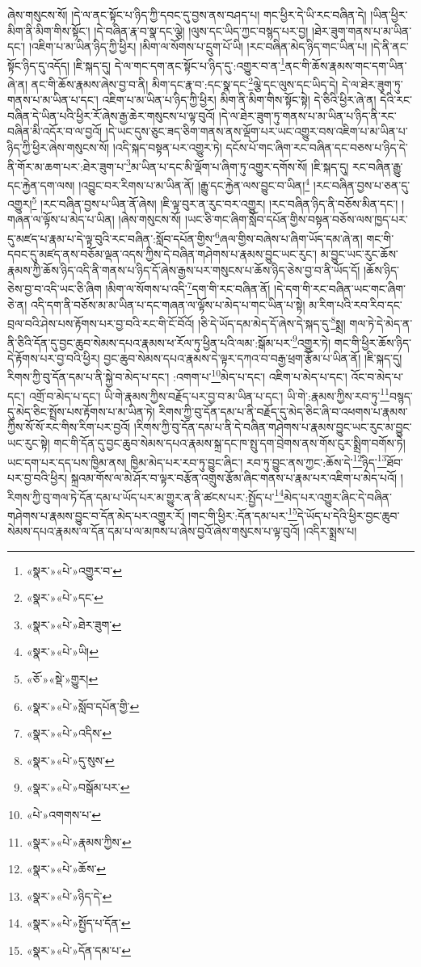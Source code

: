 ཞེས་གསུངས་སོ། །དེ་ལ་ནང་སྟོང་པ་ཉིད་ཀྱི་དབང་དུ་བྱས་ནས་བཤད་པ། གང་ཕྱིར་དེ་ཡི་རང་བཞིན་དེ། །ཡིན་ཕྱིར་མིག་ནི་མིག་གིས་སྟོང་། །དེ་བཞིན་རྣ་བ་སྣ་དང་ལྕེ། །ལུས་དང་ཡིད་ཀྱང་བསྙད་པར་བྱ། །ཐེར་ཟུག་གནས་པ་མ་ཡིན་དང་། །འཇིག་པ་མ་ཡིན་ཉིད་ཀྱི་ཕྱིར། །མིག་ལ་སོགས་པ་དྲུག་པོ་ཡི། །རང་བཞིན་མེད་ཉིད་གང་ཡིན་པ། །དེ་ནི་ནང་སྟོང་ཉིད་དུ་འདོད། །ཇི་སྐད་དུ། དེ་ལ་གང་དག་ནང་སྟོང་པ་ཉིད་དུ་:འགྱུར་བ་ན་\footnote{«སྣར་»«པེ་»འགྱུར་བ་}ནང་གི་ཆོས་རྣམས་གང་དག་ཡིན་ཞེ་ན། ནང་གི་ཆོས་རྣམས་ཞེས་བྱ་བ་ནི། མིག་དང་རྣ་བ་:དང་སྣ་དང་\footnote{«སྣར་»«པེ་»དང་}ལྕེ་དང་ལུས་དང་ཡིད་དེ། དེ་ལ་ཐེར་ཟུག་ཏུ་གནས་པ་མ་ཡིན་པ་དང་། འཇིག་པ་མ་ཡིན་པ་ཉིད་ཀྱི་ཕྱིར། མིག་ནི་མིག་གིས་སྟོང་སྟེ། དེ་ཅིའི་ཕྱིར་ཞེ་ན། དེའི་རང་བཞིན་དེ་ཡིན་པའི་ཕྱིར་རོ་ཞེས་རྒྱ་ཆེར་གསུངས་པ་ལྟ་བུའོ། །དེ་ལ་ཐེར་ཟུག་ཏུ་གནས་པ་མ་ཡིན་པ་ཉིད་ནི་རང་བཞིན་མི་འདོར་བ་ལ་བྱའོ། །དེ་ཡང་དུས་ཅུང་ཟད་ཅིག་གནས་ནས་ལྡོག་པར་ཡང་འགྱུར་བས་འཇིག་པ་མ་ཡིན་པ་ཉིད་ཀྱི་ཕྱིར་ཞེས་གསུངས་སོ། །འདི་སྐད་བསྟན་པར་འགྱུར་ཏེ། དངོས་པོ་གང་ཞིག་རང་བཞིན་དང་བཅས་པ་ཉིད་དེ་ནི་གོར་མ་ཆག་པར་:ཐེར་ཟུག་པ་\footnote{«སྣར་»«པེ་»ཐེར་ཟུག་}མ་ཡིན་པ་དང་མི་ལྡོག་པ་ཞིག་ཏུ་འགྱུར་དགོས་སོ། །ཇི་སྐད་དུ། རང་བཞིན་རྒྱུ་དང་རྐྱེན་དག་ལས། །འབྱུང་བར་རིགས་པ་མ་ཡིན་ནོ། །རྒྱུ་དང་རྐྱེན་ལས་བྱུང་བ་ཡིན།\footnote{«སྣར་»«པེ་»ཡི།} །རང་བཞིན་བྱས་པ་ཅན་དུ་འགྱུར།\footnote{«ཅོ་»«སྡེ་»གྱུར།} །རང་བཞིན་བྱས་པ་ཡིན་ནོ་ཞེས། །ཇི་ལྟ་བུར་ན་རུང་བར་འགྱུར། །རང་བཞིན་ཉིད་ནི་བཅོས་མིན་དང་། །གཞན་ལ་ལྟོས་པ་མེད་པ་ཡིན། །ཞེས་གསུངས་སོ། །ཡང་ཅི་གང་ཞིག་སློབ་དཔོན་གྱིས་བསྟན་བཅོས་ལས་ཁྱད་པར་དུ་མཛད་པ་རྣམ་པ་དེ་ལྟ་བུའི་རང་བཞིན་:སློབ་དཔོན་གྱིས་\footnote{«སྣར་»«པེ་»སློབ་དཔོན་གྱི་}ཞལ་གྱིས་བཞེས་པ་ཞིག་ཡོད་དམ་ཞེ་ན། གང་གི་དབང་དུ་མཛད་ནས་བཅོམ་ལྡན་འདས་ཀྱིས་དེ་བཞིན་གཤེགས་པ་རྣམས་བྱུང་ཡང་རུང་། མ་བྱུང་ཡང་རུང་ཆོས་རྣམས་ཀྱི་ཆོས་ཉིད་འདི་ནི་གནས་པ་ཉིད་དོ་ཞེས་རྒྱས་པར་གསུངས་པ་ཆོས་ཉིད་ཅེས་བྱ་བ་ནི་ཡོད་དོ། །ཆོས་ཉིད་ཅེས་བྱ་བ་འདི་ཡང་ཅི་ཞིག །མིག་ལ་སོགས་པ་འདི་\footnote{«སྣར་»«པེ་»འདིས་}དག་གི་རང་བཞིན་ནོ། །དེ་དག་གི་རང་བཞིན་ཡང་གང་ཞིག་ཅེ་ན། འདི་དག་ནི་བཅོས་མ་མ་ཡིན་པ་དང་གཞན་ལ་ལྟོས་པ་མེད་པ་གང་ཡིན་པ་སྟེ། མ་རིག་པའི་རབ་རིབ་དང་བྲལ་བའི་ཤེས་པས་རྟོགས་པར་བྱ་བའི་རང་གི་ངོ་བོའོ། །ཅི་དེ་ཡོད་དམ་མེད་དོ་ཞེས་དེ་སྐད་དུ་\footnote{«སྣར་»«པེ་»དུ་སུས་}སྨྲ། གལ་ཏེ་དེ་མེད་ན་ནི་ཅིའི་དོན་དུ་བྱང་ཆུབ་སེམས་དཔའ་རྣམས་ཕ་རོལ་ཏུ་ཕྱིན་པའི་ལམ་:སྒོམ་པར་\footnote{«སྣར་»«པེ་»བསྒོམ་པར་}འགྱུར་ཏེ། གང་གི་ཕྱིར་ཆོས་ཉིད་དེ་རྟོགས་པར་བྱ་བའི་ཕྱིར། བྱང་ཆུབ་སེམས་དཔའ་རྣམས་དེ་ལྟར་དཀའ་བ་བརྒྱ་ཕྲག་རྩོམ་པ་ཡིན་ནོ། །ཇི་སྐད་དུ། རིགས་ཀྱི་བུ་དོན་དམ་པ་ནི་སྐྱེ་བ་མེད་པ་དང་། :འགག་པ་\footnote{«པེ་»འགགས་པ་}མེད་པ་དང་། འཇིག་པ་མེད་པ་དང་། འོང་བ་མེད་པ་དང་། འགྲོ་བ་མེད་པ་དང་། ཡི་གེ་རྣམས་ཀྱིས་བརྗོད་པར་བྱ་བ་མ་ཡིན་པ་དང་། ཡི་གེ་:རྣམས་ཀྱིས་རབ་ཏུ་\footnote{«སྣར་»«པེ་»རྣམས་ཀྱིས་}བསྙད་དུ་མེད་ཅིང་སྤྲོས་པས་རྟོགས་པ་མ་ཡིན་ཏེ། རིགས་ཀྱི་བུ་དོན་དམ་པ་ནི་བརྗོད་དུ་མེད་ཅིང་ཞི་བ་འཕགས་པ་རྣམས་ཀྱིས་སོ་སོ་རང་གིས་རིག་པར་བྱའོ། །རིགས་ཀྱི་བུ་དོན་དམ་པ་ནི་དེ་བཞིན་གཤེགས་པ་རྣམས་བྱུང་ཡང་རུང་མ་བྱུང་ཡང་རུང་སྟེ། གང་གི་དོན་དུ་བྱང་ཆུབ་སེམས་དཔའ་རྣམས་སྐྲ་དང་ཁ་སྤུ་དག་བྲེགས་ནས་གོས་ངུར་སྨྲིག་བགོས་ཏེ། ཡང་དག་པར་དད་པས་ཁྱིམ་ནས། ཁྱིམ་མེད་པར་རབ་ཏུ་བྱུང་ཞིང་། རབ་ཏུ་བྱུང་ནས་ཀྱང་:ཆོས་དེ་\footnote{«སྣར་»«པེ་»ཆོས་}ཉིད་\footnote{«སྣར་»«པེ་»ཉིད་དེ་}ཐོབ་པར་བྱ་བའི་ཕྱིར། སྐྲའམ་གོས་ལ་མེ་ཤོར་བ་ལྟར་བརྩོན་འགྲུས་རྩོམ་ཞིང་གནས་པ་རྣམ་པར་འཇིག་པ་མེད་པའོ། །རིགས་ཀྱི་བུ་གལ་ཏེ་དོན་དམ་པ་ཡོད་པར་མ་གྱུར་ན་ནི་ཚངས་པར་:སྤྱོད་པ་\footnote{«སྣར་»«པེ་»སྤྱོད་པ་དོན་}མེད་པར་འགྱུར་ཞིང་དེ་བཞིན་གཤེགས་པ་རྣམས་བྱུང་བ་དོན་མེད་པར་འགྱུར་རོ། །གང་གི་ཕྱིར་:དོན་དམ་པར་\footnote{«སྣར་»«པེ་»དོན་དམ་པ་}དེ་ཡོད་པ་དེའི་ཕྱིར་བྱང་ཆུབ་སེམས་དཔའ་རྣམས་ལ་དོན་དམ་པ་ལ་མཁས་པ་ཞེས་བྱའོ་ཞེས་གསུངས་པ་ལྟ་བུའོ། །འདིར་སྨྲས་པ། 